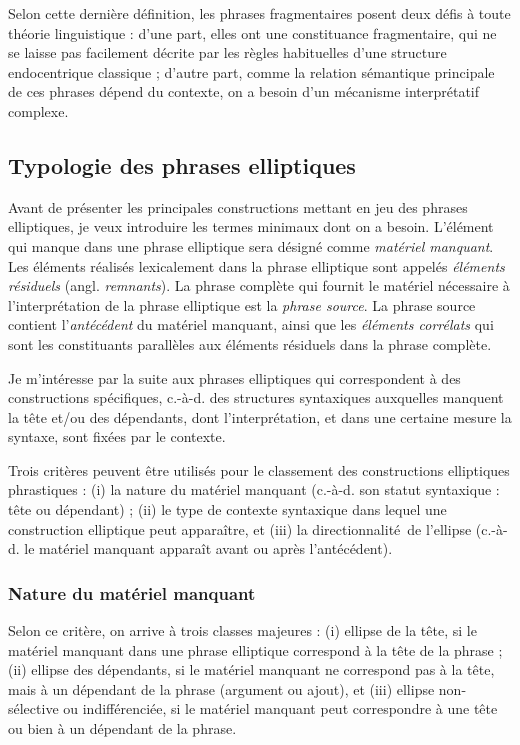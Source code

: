 Selon cette dernière définition, les phrases fragmentaires posent deux défis à toute théorie linguistique : d'une part, elles ont une constituance fragmentaire, qui ne se laisse pas facilement décrite par les règles habituelles d'une structure endocentrique classique ; d'autre part, comme la relation sémantique principale de ces phrases dépend du contexte, on a besoin d'un mécanisme interprétatif complexe.

\subsection{Typologie des phrases elliptiques} 
Avant de présenter les principales constructions mettant en jeu des phrases elliptiques, je veux introduire les termes minimaux dont on a besoin. L'élément qui manque dans une phrase elliptique sera désigné comme \textit{matériel manquant}. Les éléments réalisés lexicalement dans la phrase elliptique sont appelés \textit{éléments résiduels} (angl. \textit{remnants}). La phrase complète qui fournit le matériel nécessaire à l'interprétation de la phrase elliptique est la\textit{ phrase source}. La phrase source contient l'\textit{antécédent} du matériel manquant, ainsi que les \textit{éléments corrélats} qui sont les constituants parallèles aux éléments résiduels dans la phrase complète.  

Je m'intéresse par la suite aux phrases elliptiques qui correspondent à des constructions spécifiques, c.-à-d. des structures syntaxiques auxquelles manquent la tête et/ou des dépendants, dont l'interprétation, et dans une certaine mesure la syntaxe, sont fixées par le contexte. 

Trois critères peuvent être utilisés pour le classement des constructions elliptiques phrastiques : (i) la nature du matériel manquant (c.-à-d. son statut syntaxique : tête ou dépendant) ; (ii) le type de contexte syntaxique dans lequel une construction elliptique peut apparaître, et (iii) la directionnalité~de l'ellipse (c.-à-d. le matériel manquant apparaît avant ou après l'antécédent).

\subsubsection{Nature du matériel manquant}
\label{bkm:Ref305101923}Selon ce critère, on arrive à trois classes majeures : (i) ellipse de la tête, si le matériel manquant dans une phrase elliptique correspond à la tête de la phrase ; (ii) ellipse des dépendants, si le matériel manquant ne correspond pas à la tête, mais à un dépendant de la phrase (argument ou ajout), et (iii) ellipse non-sélective ou indifférenciée, si le matériel manquant peut correspondre à une tête ou bien à un dépendant de la phrase. 

